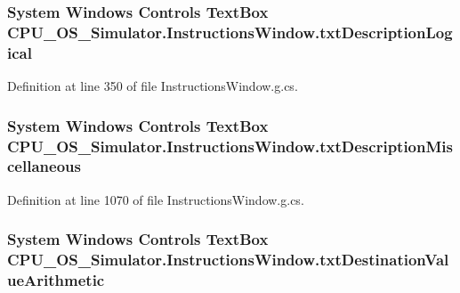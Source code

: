 \subsubsection[{txt\+Description\+Logical}]{\setlength{\rightskip}{0pt plus 5cm}System Windows Controls Text\+Box C\+P\+U\+\_\+\+O\+S\+\_\+\+Simulator.\+Instructions\+Window.\+txt\+Description\+Logical\hspace{0.3cm}{\ttfamily [package]}}\label{class_c_p_u___o_s___simulator_1_1_instructions_window_ae465810d61bb136b7934563cf85b3027}


Definition at line 350 of file Instructions\+Window.\+g.\+cs.

\hypertarget{class_c_p_u___o_s___simulator_1_1_instructions_window_aaf938911ac6e23d7d637245cf40e6cbe}{}
\subsubsection[{txt\+Description\+Miscellaneous}]{\setlength{\rightskip}{0pt plus 5cm}System Windows Controls Text\+Box C\+P\+U\+\_\+\+O\+S\+\_\+\+Simulator.\+Instructions\+Window.\+txt\+Description\+Miscellaneous\hspace{0.3cm}{\ttfamily [package]}}\label{class_c_p_u___o_s___simulator_1_1_instructions_window_aaf938911ac6e23d7d637245cf40e6cbe}


Definition at line 1070 of file Instructions\+Window.\+g.\+cs.

\hypertarget{class_c_p_u___o_s___simulator_1_1_instructions_window_adac073cb591b15be22d041695ff498e4}{}
\subsubsection[{txt\+Destination\+Value\+Arithmetic}]{\setlength{\rightskip}{0pt plus 5cm}System Windows Controls Text\+Box C\+P\+U\+\_\+\+O\+S\+\_\+\+Simulator.\+Instructions\+Window.\+txt\+Destination\+Value\+Arithmetic\hspace{0.3cm}{\ttfamily [package]}}\label{class_c_p_u___o_s___simulator_1_1_instructions_window_adac073cb591b15be22d041695ff498e4}



